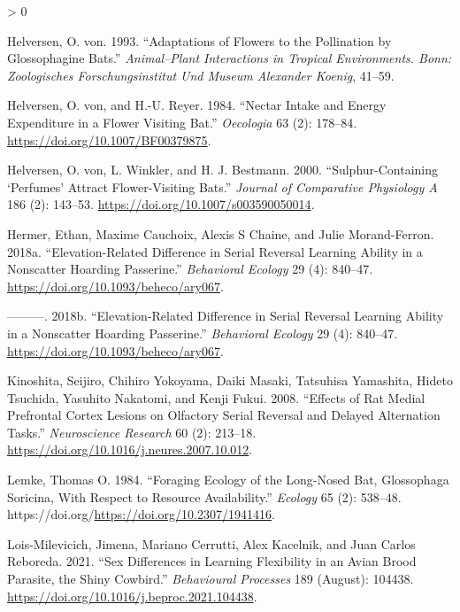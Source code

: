\documentclass[
]{article}
\newlength{\cslhangindent}
\newenvironment{CSLReferences}[2] %
 {%
  \setlength{\parindent}{0pt}
  \ifodd #1 \everypar{\setlength{\hangindent}{\cslhangindent}}\ignorespaces\fi
  \ifnum #2 > 0
  \setlength{\parskip}{#2\baselineskip}
  \fi
 }%
 {}
\begin{document}
\begin{CSLReferences}{1}{0}
\leavevmode\hypertarget{ref-von_helversen_adaptations_1993}{}%
Helversen, O. von. 1993. {``Adaptations of Flowers to the Pollination by {Glossophagine} Bats.''} \emph{Animal--Plant Interactions in Tropical Environments. Bonn: Zoologisches Forschungsinstitut Und Museum Alexander Koenig}, 41--59.

\leavevmode\hypertarget{ref-von_helversen_nectar_1984}{}%
Helversen, O. von, and H.-U. Reyer. 1984. {``Nectar Intake and Energy Expenditure in a Flower Visiting Bat.''} \emph{Oecologia} 63 (2): 178--84. \url{https://doi.org/10.1007/BF00379875}.

\leavevmode\hypertarget{ref-von_helversen_sulphur-containing_2000}{}%
Helversen, O. von, L. Winkler, and H. J. Bestmann. 2000. {``Sulphur-Containing {`Perfumes'} Attract Flower-Visiting Bats.''} \emph{Journal of Comparative Physiology A} 186 (2): 143--53. \url{https://doi.org/10.1007/s003590050014}.

\leavevmode\hypertarget{ref-hermer_elevation-related_2018}{}%
Hermer, Ethan, Maxime Cauchoix, Alexis S Chaine, and Julie Morand-Ferron. 2018a. {``Elevation-Related Difference in Serial Reversal Learning Ability in a Nonscatter Hoarding Passerine.''} \emph{Behavioral Ecology} 29 (4): 840--47. \url{https://doi.org/10.1093/beheco/ary067}.

\leavevmode\hypertarget{ref-hermer_elevation-related_2018-1}{}%
---------. 2018b. {``Elevation-Related Difference in Serial Reversal Learning Ability in a Nonscatter Hoarding Passerine.''} \emph{Behavioral Ecology} 29 (4): 840--47. \url{https://doi.org/10.1093/beheco/ary067}.

\leavevmode\hypertarget{ref-kinoshita_effects_2008}{}%
Kinoshita, Seijiro, Chihiro Yokoyama, Daiki Masaki, Tatsuhisa Yamashita, Hideto Tsuchida, Yasuhito Nakatomi, and Kenji Fukui. 2008. {``Effects of Rat Medial Prefrontal Cortex Lesions on Olfactory Serial Reversal and Delayed Alternation Tasks.''} \emph{Neuroscience Research} 60 (2): 213--18. \url{https://doi.org/10.1016/j.neures.2007.10.012}.

\leavevmode\hypertarget{ref-lemke_foraging_1984}{}%
Lemke, Thomas O. 1984. {``Foraging {Ecology} of the {Long}-{Nosed} {Bat}, {Glossophaga} {Soricina}, {With} {Respect} to {Resource} {Availability}.''} \emph{Ecology} 65 (2): 538--48. https://doi.org/\url{https://doi.org/10.2307/1941416}.

\leavevmode\hypertarget{ref-lois-milevicich_sex_2021}{}%
Lois-Milevicich, Jimena, Mariano Cerrutti, Alex Kacelnik, and Juan Carlos Reboreda. 2021. {``Sex Differences in Learning Flexibility in an Avian Brood Parasite, the Shiny Cowbird.''} \emph{Behavioural Processes} 189 (August): 104438. \url{https://doi.org/10.1016/j.beproc.2021.104438}.


\end{CSLReferences}
\end{document}
